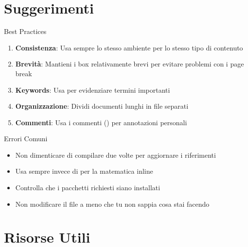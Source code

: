 \documentclass{csnotes}
\begin{document}

\section{Suggerimenti}

\begin{note}{Best Practices}
\begin{enumerate}
    \item \textbf{Consistenza}: Usa sempre lo stesso ambiente per lo stesso 
    tipo di contenuto
    \item \textbf{Brevità}: Mantieni i box relativamente brevi per evitare 
    problemi con i page break
    \item \textbf{Keywords}: Usa  per 
    evidenziare termini importanti
    \item \textbf{Organizzazione}: Dividi documenti lunghi in file separati
    \item \textbf{Commenti}: Usa i commenti (\code{\%}) per annotazioni personali
\end{enumerate}
\end{note}

\begin{warning}{Errori Comuni}
\begin{itemize}
    \item Non dimenticare di compilare due volte per aggiornare i riferimenti
    \item Usa sempre  invece di 
     per la matematica inline
    \item Controlla che i pacchetti richiesti siano installati
    \item Non modificare il file  a meno che tu non sappia 
    cosa stai facendo
\end{itemize}
\end{warning}


\section{Risorse Utili}
\end{document}
